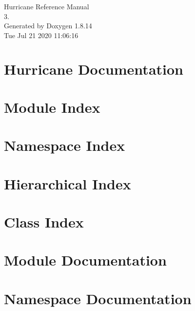 \documentclass[a4paper]{asimbook}
\begin{document}
   \begin{titlepage}
     \vspace*{7cm}
     \begin{center}
     {\Large Hurricane Reference Manual\\[1ex]\large 3. }\\
     \vspace*{1cm}
     {\large Generated by Doxygen 1.8.14}\\
     \vspace*{0.5cm}
     {\small Tue Jul 21 2020 11:06:16}\\
     \end{center}
   \end{titlepage}

   \clearemptydoublepage

   \tableofcontents
   \clearemptydoublepage

\chapter{Hurricane Documentation}
\label{index}\hypertarget{index}{}
\chapter{Module Index}

\chapter{Namespace Index}

\chapter{Hierarchical Index}

\chapter{Class Index}

\chapter{Module Documentation}




\chapter{Namespace Documentation}

\end{document}

